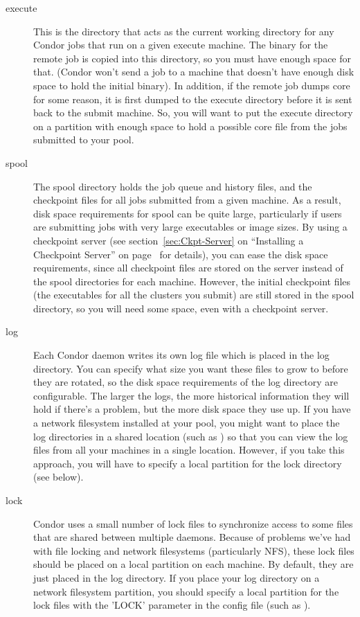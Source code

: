 \begin{description}
\item[execute] This is the directory that acts as the current working
directory for any Condor jobs that run on a given execute machine.
The binary for the remote job is copied into this directory, so you
must have enough space for that.  (Condor won't send a job to a
machine that doesn't have enough disk space to hold the initial
binary).  In addition, if the remote job dumps core for some reason,
it is first dumped to the execute directory before it is sent back to
the submit machine.  So, you will want to put the execute directory on
a partition with enough space to hold a possible core file from the
jobs submitted to your pool.

\item[spool] The spool directory holds the job queue and history
files, and the checkpoint files for all jobs submitted from a given
machine.  As a result, disk space requirements for spool can be quite
large, particularly if users are submitting jobs with very large
executables or image sizes.  By using a checkpoint server (see
section~\ref{sec:Ckpt-Server} on ``Installing a Checkpoint Server'' on
page~\pageref{sec:Ckpt-Server} for details), you can ease the disk
space requirements, since all checkpoint files are stored on the
server instead of the spool directories for each machine.  However,
the initial checkpoint files (the executables for all the clusters you
submit) are still stored in the spool directory, so you will need some
space, even with a checkpoint server.

\item[log] Each Condor daemon writes its own log file which is placed
in the log directory.  You can specify what size you want these files
to grow to before they are rotated, so the disk space requirements of
the log directory are configurable.  The larger the logs, the more
historical information they will hold if there's a problem, but the
more disk space they use up.  If you have a network filesystem
installed at your pool, you might want to place the log directories in
a shared location (such as )
so that you can view the log files from all your machines in a single
location.  However, if you take this approach, you will have to
specify a local partition for the lock directory (see below).

\item[lock] Condor uses a small number of lock files to synchronize
access to some files that are shared between multiple daemons.
Because of problems we've had with file locking and network
filesystems (particularly NFS), these lock files should be placed on a
local partition on each machine.  By default, they are just placed in
the log directory.  If you place your log directory on a network
filesystem partition, you should specify a local partition for the
lock files with the 'LOCK' parameter in the config file (such as
).

\end{description}


